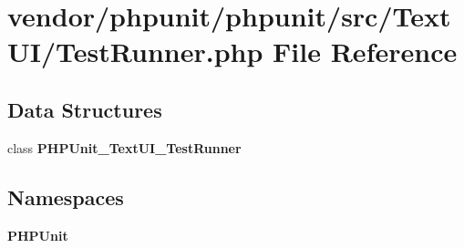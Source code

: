 \section{vendor/phpunit/phpunit/src/\+Text\+U\+I/\+Test\+Runner.php File Reference}
\label{_test_runner_8php}
\subsection*{Data Structures}
\begin{DoxyCompactItemize}
\item 
class {\bf P\+H\+P\+Unit\+\_\+\+Text\+U\+I\+\_\+\+Test\+Runner}
\end{DoxyCompactItemize}
\subsection*{Namespaces}
\begin{DoxyCompactItemize}
\item 
 {\bf P\+H\+P\+Unit}
\end{DoxyCompactItemize}

